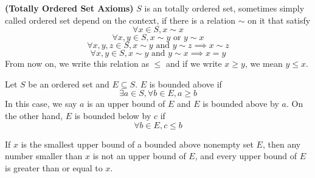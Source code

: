 \documentclass{report}
\begin{document}
\begin{definition}
\label{1.1.4}
\textbf{(Totally Ordered Set Axioms)} $S$ is an totally ordered set, sometimes simply called  ordered set depend on the context, if there is a relation $\sim$ on it that satisfy 
\begin{equation*}
\forall x\in S, x\sim x
\end{equation*}
\begin{equation*}
\forall x,y\in S, x\sim y\text{ or }y\sim x
\end{equation*}
\begin{equation*}
  \forall x,y,z\in S, x\sim y \text{ and }y\sim z\implies x\sim z
\end{equation*}
\begin{equation*}
\forall x,y\in S, x\sim y\text{ and }y\sim x \implies x=y
\end{equation*}
From now on, we write this relation as $\leq $ and if we write  $x\geq y$, we mean $y\leq x$.
\end{definition}
\begin{definition}
\label{1.1.5}
Let $S$ be an ordered set and $E\subseteq S$. $E$ is bounded above if 
\begin{equation*}
\exists a\in S, \forall b\in E, a\geq b 
\end{equation*}
In this case, we say $a$ is an upper bound of $E$ and $E$ is bounded above by $a$. On the other hand, $E$ is bounded below by $c$ if
\begin{equation*}
\forall b\in E, c\leq b
\end{equation*}
\end{definition}
\begin{theorem}
\label{1.1.6}
If $x$ is the smallest upper bound of a bounded above nonempty set  $E$, then any number smaller than  $x$ is not an upper bound of  $E$, and every upper bound of  $E$ is greater than or equal  to $x$.
\end{theorem}
\end{document}
